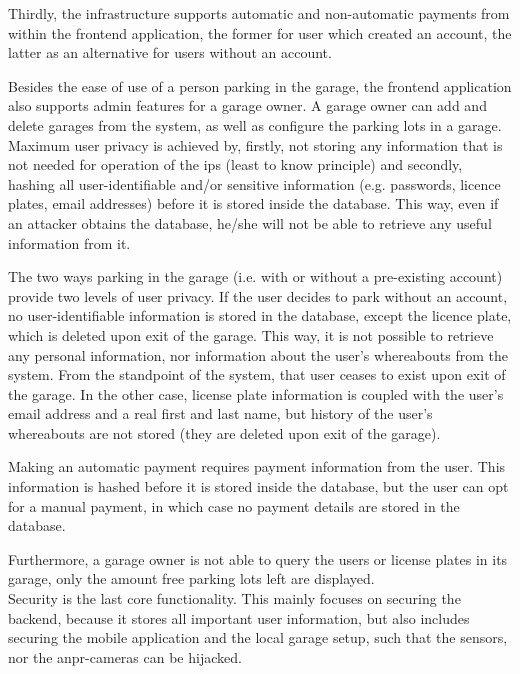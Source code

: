 \ind Thirdly, the infrastructure supports automatic and non-automatic payments from within the frontend application, the former for user which created an account, the latter as an alternative for users without an account. 

\ind Besides the ease of use of a person parking in the garage, the frontend application also supports admin features for a garage owner. A garage owner can add and delete garages from the system, as well as configure the parking lots in a garage. \\

Maximum user privacy is achieved by, firstly, not storing any information that is not needed for operation of the \ac{ips} (least to know principle) and secondly, hashing all user-identifiable and/or sensitive information (e.g. passwords, licence plates, email addresses) before it is stored inside the database. This way, even if an attacker obtains the database, he/she will not be able to retrieve any useful information from it.

\ind The two ways parking in the garage (i.e. with or without a pre-existing account) provide two levels of user privacy. If the user decides to park without an account, no user-identifiable information is stored in the database, except the licence plate, which is deleted upon exit of the garage. This way, it is not possible to retrieve any personal information, nor information about the user's whereabouts from the system. From the standpoint of the system, that user ceases to exist upon exit of the garage. In the other case, license plate information is coupled with the user's email address and a real first and last name, but history of the user's whereabouts are not stored (they are deleted upon exit of the garage).

\ind Making an automatic payment requires payment information from the user. This information is hashed before it is stored inside the database, but the user can opt for a manual payment, in which case no payment details are stored in the database.

\ind Furthermore, a garage owner is not able to query the users or license plates in its garage, only the amount free parking lots left are displayed. \\ 

Security is the last core functionality. This mainly focuses on securing the backend, because it stores all important user information, but also includes securing the mobile application and the local garage setup, such that the sensors, nor the \ac{anpr}-cameras can be hijacked. 

